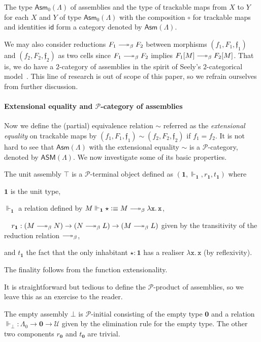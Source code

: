 \documentclass[a4paper,UKenglish,numberwithinsect,cleveref,thm-restate]{lipics-v2021}
\newcommand{\PP}{\mathscr{P}}
\newcommand{\Asm}{\mathsf{Asm}}
\newcommand{\ASM}{\mathsf{ASM}}
\newcommand{\defeq}{\vcentcolon\equiv}
\newcommand{\Univ}{\mathcal{U}}
\newcommand{\id}{\mathsf{id}}
\newcommand{\Unit}{\mathbf{1}}
\newcommand{\Empty}{\mathbf{0}}
\DeclareRobustCommand\longtwoheadrightarrow{\relbar\joinrel\twoheadrightarrow}
\newcommand{\reduce}{\longtwoheadrightarrow_{\beta}}
\theoremstyle{plain}
\begin{document}
\begin{proposition}\label{prop:category-of-assemblies}
  The type $\Asm_0(\Lambda)$ of assemblies and the type of trackable maps from $X$ to $Y$ for each $X$ and $Y$ of type $\Asm_0(\Lambda)$ with the composition $\circ$ for trackable maps and identities $\id$ form a category denoted by $\Asm(\Lambda)$.
\end{proposition}
We may also consider reductions $F_1 \reduce F_2$ between morphisms $(f_1, F_1, \mathfrak{f}_1)$
and $(f_2, F_2, \mathfrak{f}_2)$ as two cells since $F_1 \reduce F_2$ implies $F_1[M] \reduce F_2[M]$.
That is, we do have a $2$-category of assemblies in the spirit of Seely's $2$-categorical model~\cite{Seely1987}.
This line of research is out of scope of this paper, so we refrain ourselves from further discussion. 


\paragraph*{Extensional equality and \texorpdfstring{$\PP$}{P}-category of assemblies}
Now we define the (partial) equivalence relation $\sim$ referred as the \emph{extensional equality} on trackable maps by $(f_1, F_1, \mathfrak{f}_1) \sim (f_2, F_2, \mathfrak{f}_2)$ if $f_1 = f_2$.
It is not hard to see that $\Asm(\Lambda)$ with the extensional equality $\sim$ is a $\PP$-category, denoted by $\ASM(\Lambda)$. 
We now investigate some of its basic properties.

\begin{example}
  The unit assembly $\top$ is a $\PP$-terminal object defined as $(\Unit, \Vdash_{\Unit}, r_{\Unit}, t_{\Unit})$ where 
  \begin{romanenumerate}
    \item $\Unit$ is the unit type,  
    \item $\Vdash_{\Unit}$ a relation defined by $M \Vdash_{\Unit} \star \defeq M \reduce \mathtt{\lambda x.\, x}$, 
    \item $\quad r_{\Unit}: (M \reduce N) \to (N \reduce L) \to (M \reduce L)$ given by the transitivity of the reduction relation $\reduce$,
    \item and $t_{\Unit}$ the fact that the only inhabitant $\star : \Unit$ has a realiser $\mathtt{\lambda x.\, x}$ (by reflexivity).
  \end{romanenumerate}
  The finality follows from the function extensionality.
\end{example}

It is straightforward but tedious to define the $\PP$-product of assemblies, so we leave this as an exercise to the reader. 
\begin{example}
The empty assembly $\bot$ is $\PP$-initial consisting of the empty type $\Empty$ and a relation $\Vdash_\bot : \Lambda_0 \to \Empty \to \Univ$ given by the elimination rule for the empty type.
The other two components $r_\Empty$ and $t_\Empty$ are trivial.
\end{example}
\end{document}

